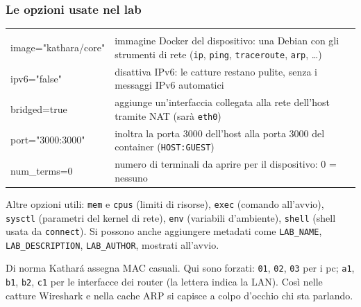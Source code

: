 \subsubsection{Le opzioni usate nel lab}
\begin{center}
\begin{tabularx}{\linewidth}{>{\ttfamily}l Y}
 & \\
image="kathara/core" & immagine Docker del dispositivo: una Debian con gli strumenti di rete (\texttt{ip}, \texttt{ping}, \texttt{traceroute}, \texttt{arp}, \dots)\\
ipv6="false" & disattiva IPv6: le catture restano pulite, senza i messaggi IPv6 automatici\\
bridged=true & aggiunge un'interfaccia collegata alla rete dell'host tramite NAT (sarà \texttt{eth0})\\
port="3000:3000" & inoltra la porta 3000 dell'host alla porta 3000 del container (\texttt{HOST:GUEST})\\
num\_terms=0 & numero di terminali da aprire per il dispositivo: 0 = nessuno\\
\end{tabularx}
\end{center}
Altre opzioni utili: \texttt{mem} e \texttt{cpus} (limiti di risorse), \texttt{exec} (comando all'avvio), \texttt{sysctl} (parametri del kernel di rete), \texttt{env} (variabili d'ambiente), \texttt{shell} (shell usata da \texttt{connect}). Si possono anche aggiungere metadati come \texttt{LAB\_NAME}, \texttt{LAB\_DESCRIPTION}, \texttt{LAB\_AUTHOR}, mostrati all'avvio.

\begin{mlbox}
Di norma Kathará assegna MAC casuali. Qui sono forzati: \texttt{01}, \texttt{02}, \texttt{03} per i pc; \texttt{a1}, \texttt{b1}, \texttt{b2}, \texttt{c1} per le interfacce dei router (la lettera indica la LAN). Così nelle catture Wireshark e nella cache ARP si capisce a colpo d'occhio chi sta parlando.
\end{mlbox}

